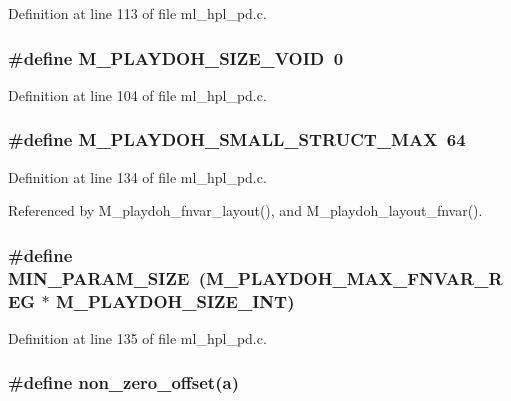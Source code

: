 Definition at line 113 of file ml\_\-hpl\_\-pd.c.
\subsubsection{\setlength{\rightskip}{0pt plus 5cm}\#define M\_\-PLAYDOH\_\-SIZE\_\-VOID~0}\label{ml__hpl__pd_8c_3eac43ed02569d47d467404d7da5964e}




Definition at line 104 of file ml\_\-hpl\_\-pd.c.
\subsubsection{\setlength{\rightskip}{0pt plus 5cm}\#define M\_\-PLAYDOH\_\-SMALL\_\-STRUCT\_\-MAX~64}\label{ml__hpl__pd_8c_02870c1424ba9e44089fa5f45ea89160}




Definition at line 134 of file ml\_\-hpl\_\-pd.c.

Referenced by M\_\-playdoh\_\-fnvar\_\-layout(), and M\_\-playdoh\_\-layout\_\-fnvar().
\subsubsection{\setlength{\rightskip}{0pt plus 5cm}\#define MIN\_\-PARAM\_\-SIZE~(M\_\-PLAYDOH\_\-MAX\_\-FNVAR\_\-REG $\ast$ M\_\-PLAYDOH\_\-SIZE\_\-INT)}\label{ml__hpl__pd_8c_48f1f5d33d6770a468f7767465e07abb}




Definition at line 135 of file ml\_\-hpl\_\-pd.c.
\subsubsection{\setlength{\rightskip}{0pt plus 5cm}\#define non\_\-zero\_\-offset(a)}\label{ml__hpl__pd_8c_1a7d03fa0a676d3b09e555d8c8176f1b}



